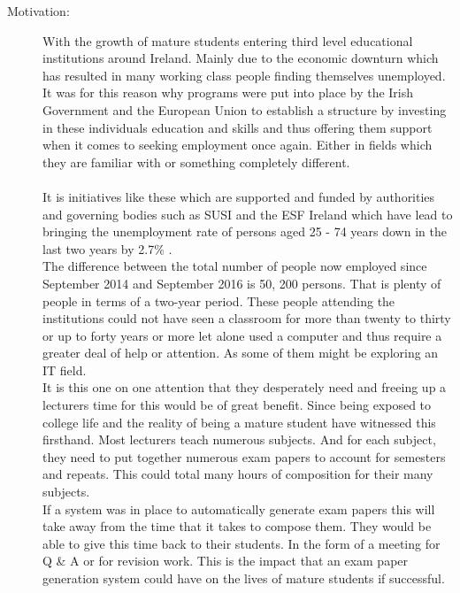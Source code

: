 \begin{description}
  \item[Motivation:]
  
  \begin{comment}
Why do we care about the problem and the results? If the problem isn't obviously
"interesting" it might be better to put motivation first; but if your work is incremental progress
on a problem that is widely recognised as important, then it is probably better to put the problem
statement first to indicate which piece of the larger problem you are breaking off to work on. This
section should include the importance of your work, the difficulty of the area, and the impact it
might have if successful.
\end{comment}

With the growth of mature students entering third level educational institutions around Ireland. Mainly due to the economic downturn which has resulted in many working class people finding themselves unemployed. \\It was for this reason why programs were put into place by the Irish Government and the European Union to establish a structure by investing in these individuals education and skills and thus offering them support when it comes to seeking employment once again. Either in fields which they are familiar with or something completely different. \\ \\It is initiatives like these which are supported and funded by authorities and governing bodies such as SUSI and the ESF Ireland which have lead to bringing the unemployment rate of persons aged 25 - 74 years down in the last two years by 2.7\% \cite{Cso2016} \cite{Esf2016}. \\The difference between the total number of people now employed since September 2014 and September 2016 is 50, 200 persons. That is plenty of people in terms of a two-year period. These people attending the institutions could not have seen a classroom for more than twenty to thirty or up to forty years or more let alone used a computer and thus require a greater deal of help or attention. As some of them might be exploring an IT field. \\It is this one on one attention that they desperately need and freeing up a lecturers time for this would be of great benefit. Since being exposed to college life and the reality of being a mature student have witnessed this firsthand. Most lecturers teach numerous subjects. And for each subject, they need to put together numerous exam papers to account for semesters and repeats. This could total many hours of composition for their many subjects. \\If a system was in place to automatically generate exam papers this will take away from the time that it takes to compose them. They would be able to give this time back to their students. In the form of a meeting for Q \& A or for revision work. This is the impact that an exam paper generation system could have on the lives of mature students if successful.


\end{description}
